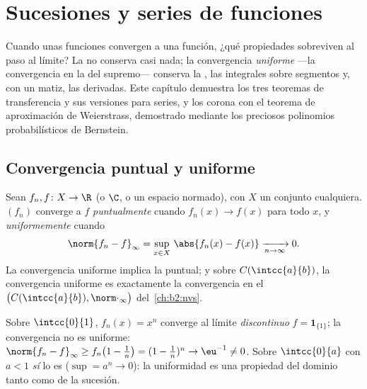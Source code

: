 \chapter{Sucesiones y series de funciones}\label{ch:b2:funcseq}

Cuando unas funciones convergen a una función, ¿qué propiedades
sobreviven al paso al límite? La  no conserva casi
nada; la convergencia \emph{uniforme} ---la convergencia en la
 del supremo--- conserva la , las integrales sobre
segmentos y, con un matiz, las derivadas. Este capítulo demuestra los
tres teoremas de transferencia y sus versiones para series, y los
corona con el teorema de aproximación de Weierstrass, demostrado
mediante los preciosos polinomios probabilísticos de Bernstein.

\section{Convergencia puntual y uniforme}

\begin{definition}\label{def:b2:funcseq:def}
Sean $f_n, f \colon X \to \R$ (o $\C$, o un espacio normado), con $X$
un conjunto cualquiera. $(f_n)$ converge a $f$
\emph{puntualmente} cuando $f_n(x) \to
f(x)$ para todo $x$, y \emph{uniformemente} cuando
\[
\norm{f_n - f}_\infty = \sup_{x \in X}\, \abs{f_n(x) - f(x)}
\xrightarrow[n \to \infty]{} 0 .
\]
La convergencia uniforme implica la puntual; y sobre
$C(\intcc{a}{b})$, la convergencia uniforme es exactamente la
convergencia en el  $\bigl(C(\intcc{a}{b}),
\norm\cdot_\infty\bigr)$ del~\cref{ch:b2:nvs}.
\end{definition}

\begin{example}\label{ex:b2:funcseq:xn}
Sobre $\intcc{0}{1}$, $f_n(x) = x^n$ converge  al límite
\emph{discontinuo} $f = \mathbf{1}_{\{1\}}$; la convergencia no es
uniforme: $\norm{f_n - f}_\infty \geq f_n\bigl(1 - \tfrac1n\bigr) =
(1 - \tfrac1n)^n \to \eu^{-1} \neq 0$. Sobre $\intcc{0}{a}$ con $a <
1$ \emph{sí} lo es ($\sup = a^n \to 0$): la uniformidad es una
propiedad del dominio tanto como de la sucesión.
\end{example}

